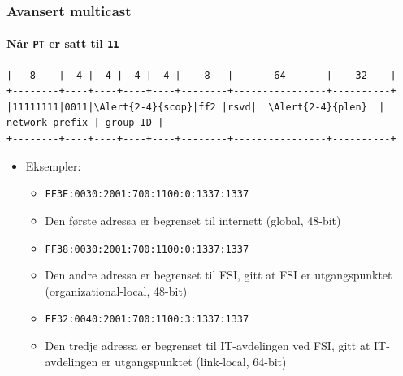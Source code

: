 \begin{frame}[fragile]%
  \frametitle{Avansert multicast}
  \framesubtitle{Når \texttt{PT} er satt til \texttt{11}}
\begin{Verbatim}[commandchars=\\\{\},fontsize=\tiny]
|   8    |  4 |  4 |  4 |  4 |    8   |       64       |    32    |
+--------+----+----+----+----+--------+----------------+----------+
|11111111|0011|\Alert{2-4}{scop}|ff2 |rsvd|  \Alert{2-4}{plen}  | network prefix | group ID |
+--------+----+----+----+----+--------+----------------+----------+
\end{Verbatim}
  \begin{itemize}%
  \item Eksempler:
    \begin{itemize}%
    \item \texttt{FF3\alert<2>{E}:00\alert<2>{30}:2001:700:1100:0:1337:1337}
    \item Den første adressa er begrenset til internett (global,
      48-bit)
    \item \texttt{FF3\alert<3>{8}:00\alert<3>{30}:2001:700:1100:0:1337:1337}
    \item Den andre adressa er begrenset til FSI, gitt at FSI er
      utgangspunktet (organizational-local, 48-bit)
    \item \texttt{FF3\alert<4>{2}:00\alert<4>{40}:2001:700:1100:3:1337:1337}
    \item Den tredje adressa er begrenset til IT-avdelingen ved FSI,
      gitt at IT-avdelingen er utgangspunktet (link-local, 64-bit)
    \end{itemize}
  \end{itemize}
\end{frame}


